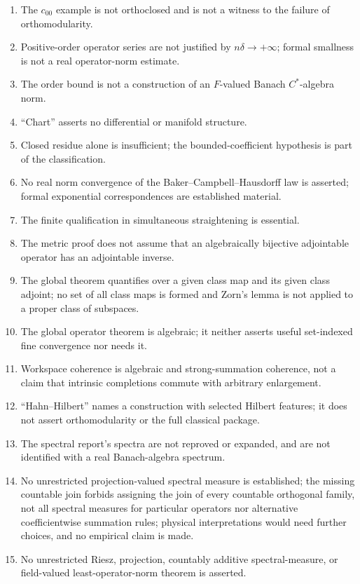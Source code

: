 \documentclass[11pt,letterpaper]{article}
\numberwithin{equation}{section}
\theoremstyle{definition}
\theoremstyle{remark}
\newcommand{\F}{F}
\begin{document}
\begin{enumerate}[leftmargin=*,widest=00,label=06.\arabic*]
\item The $c_{00}$ example is not orthoclosed and is not a witness to the
failure of orthomodularity.
\item Positive-order operator series are not justified by
$n\delta\to+\infty$; formal smallness is not a real operator-norm estimate.
\item The order bound is not a construction of an $\F$-valued Banach
$C^*$-algebra norm.
\item ``Chart'' asserts no differential or manifold structure.
\item Closed residue alone is insufficient; the bounded-coefficient
hypothesis is part of the classification.
\item No real norm convergence of the Baker--Campbell--Hausdorff law is
asserted; formal exponential correspondences are established material.
\item The finite qualification in simultaneous straightening is essential.
\item The metric proof does not assume that an algebraically bijective
adjointable operator has an adjointable inverse.
\item The global theorem quantifies over a given class map and its given
class adjoint; no set of all class maps is formed and Zorn's lemma is not
applied to a proper class of subspaces.
\item The global operator theorem is algebraic; it neither asserts useful
set-indexed fine convergence nor needs it.
\item Workspace coherence is algebraic and strong-summation coherence, not a
claim that intrinsic completions commute with arbitrary enlargement.
\item ``Hahn--Hilbert'' names a construction with selected Hilbert features;
it does not assert orthomodularity or the full classical package.
\item The spectral report's spectra are not reproved or expanded, and are not
identified with a real Banach-algebra spectrum.
\item No unrestricted projection-valued spectral measure is established; the
missing countable join forbids assigning the join of every countable
orthogonal family, not all spectral measures for particular operators nor
alternative coefficientwise summation rules; physical interpretations would
need further choices, and no empirical claim is made.
\item No unrestricted Riesz, projection, countably additive spectral-measure,
or field-valued least-operator-norm theorem is asserted.

\end{enumerate}
\end{document}

